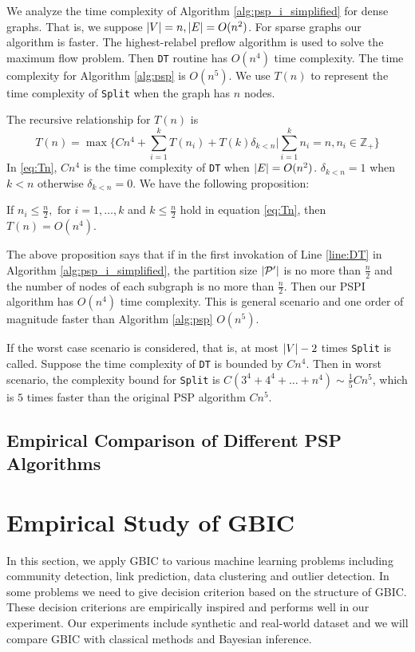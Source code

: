 We analyze the time complexity of Algorithm \ref{alg:psp_i_simplified} for dense graphs. That is, we suppose $\lvert V\rvert = n, \lvert E\rvert = O(n^2)$. For sparse graphs our algorithm is faster. The highest-relabel preflow algorithm is used to solve the maximum flow problem. Then \texttt{DT} routine has $O(n^4)$ time complexity. The time complexity for Algorithm \ref{alg:psp} is $O(n^5)$.
We use $T(n)$ to represent the time complexity of \texttt{Split} when the graph has $n$ nodes.

The recursive relationship for $T(n)$ is
\begin{equation}\label{eq:Tn}
T(n) = \max \{ C n^4 + \sum_{i=1}^k T(n_i) + T(k)\delta_{k<n} | \sum_{i=1}^k n_i = n, n_i \in \mathbb{Z}_{+} \}
\end{equation}	
In \eqref{eq:Tn}, $Cn^4$ is the time complexity of \texttt{DT} when $\lvert E\rvert = O(n^2)$. $\delta_{k<n} = 1$ when $k<n$ otherwise $\delta_{k<n}=0$. We have the following proposition:
\begin{proposition}\label{prop:alg_complexity}
	 If $n_i \leq \frac{n}{2}, \textrm{ for } i=1,\dots,k$ and $ k \leq \frac{n}{2}$  hold in equation \eqref{eq:Tn}, then $T(n) = O(n^4)$.
\end{proposition}

The above proposition says that if in the first invokation of Line \ref{line:DT} in Algorithm \ref{alg:psp_i_simplified}, the partition size $\lvert\mathcal{P}'\rvert$ is no more than $\frac{n}{2}$ and the number of nodes of each subgraph is no more than $\frac{n}{2}$. Then our PSPI algorithm has $O(n^4)$ time complexity. This is general scenario and one order of magnitude faster than Algorithm \ref{alg:psp} $O(n^5)$.

If the worst case scenario is considered, that is, at most $\lvert V\rvert-2$ times \texttt{Split} is called. Suppose the time complexity of \texttt{DT} is bounded by $Cn^4$. Then in worst scenario, the complexity bound for \texttt{Split} is $C(3^4+4^4 + \dots + n^4) \sim \frac{1}{5}Cn^5$, which is $5$ times faster than the original PSP algorithm $Cn^5$.
\subsection{Empirical Comparison of Different PSP Algorithms}

\section{Empirical Study of GBIC}\label{sec:es}
In this section, we apply GBIC to various machine learning problems including community detection, link prediction, data clustering and outlier detection. In some problems we need to give decision criterion  based on the structure of GBIC. These decision criterions are empirically inspired and performs well in our experiment.  Our experiments
include synthetic and real-world dataset and we will compare GBIC with classical methods and Bayesian inference.
